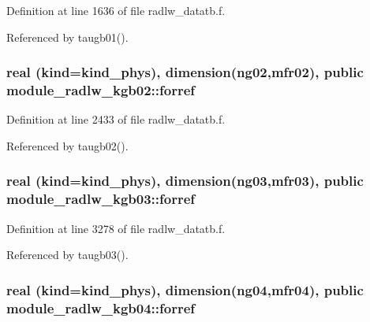 Definition at line 1636 of file radlw\+\_\+datatb.\+f.



Referenced by taugb01().

\subsubsection[{\texorpdfstring{forref}{forref}}]{\setlength{\rightskip}{0pt plus 5cm}real (kind=kind\+\_\+phys), dimension(ng02,mfr02), public module\+\_\+radlw\+\_\+kgb02\+::forref}\hypertarget{group__module__radlw__main_gaf6f3d7a0ab6858eab9d4d3e2d2d68031}{}\label{group__module__radlw__main_gaf6f3d7a0ab6858eab9d4d3e2d2d68031}


Definition at line 2433 of file radlw\+\_\+datatb.\+f.



Referenced by taugb02().

\subsubsection[{\texorpdfstring{forref}{forref}}]{\setlength{\rightskip}{0pt plus 5cm}real (kind=kind\+\_\+phys), dimension(ng03,mfr03), public module\+\_\+radlw\+\_\+kgb03\+::forref}\hypertarget{group__module__radlw__main_gafcc55fa81ba6369b56d29db2342c2e6a}{}\label{group__module__radlw__main_gafcc55fa81ba6369b56d29db2342c2e6a}


Definition at line 3278 of file radlw\+\_\+datatb.\+f.



Referenced by taugb03().

\subsubsection[{\texorpdfstring{forref}{forref}}]{\setlength{\rightskip}{0pt plus 5cm}real (kind=kind\+\_\+phys), dimension(ng04,mfr04), public module\+\_\+radlw\+\_\+kgb04\+::forref}\hypertarget{group__module__radlw__main_ga816fd065291a92c13d026d38a708479b}{}\label{group__module__radlw__main_ga816fd065291a92c13d026d38a708479b}


